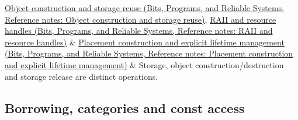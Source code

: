 {\begin{longtable}[]
\href{../01-Bits-Programs-and-Reliable-Systems/main.pdf\#nameddest=appendix-a82f9c438857}{Object construction and storage reuse (Bits, Programs, and Reliable Systems, Reference notes: Object construction and storage reuse)}, \href{../01-Bits-Programs-and-Reliable-Systems/main.pdf\#nameddest=appendix-69739d3ab49b}{RAII and resource handles (Bits, Programs, and Reliable Systems, Reference notes: RAII and resource handles)} & \href{../01-Bits-Programs-and-Reliable-Systems/main.pdf\#nameddest=appendix-f56c3e43fd4e}{Placement construction and explicit lifetime management (Bits, Programs, and Reliable Systems, Reference notes: Placement construction and explicit lifetime management)} & Storage, object construction/destruction and storage release are distinct operations. \\
\end{longtable}
}

\subsection{Borrowing, categories and const access}\label{appendix-4ad47bdd269a-borrowing-categories-and-const-access}

